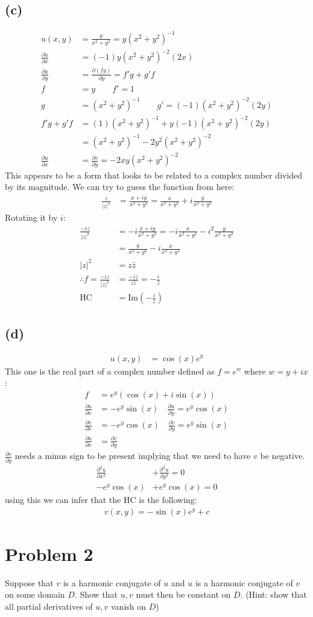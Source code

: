 \documentclass{article}
\let\oldcos\cos
\let\oldsin\sin
\renewcommand{\cos}[1]{\oldcos\left(#1\right)}
\renewcommand{\sin}[1]{\oldsin\left(#1\right)}
\newcommand{\parder}[2]{\frac{\partial#1}{\partial#2}}
\newcommand{\secparder}[2]{\frac{\partial^2#1}{\partial#2^2}}
\begin{document}
\subsection*{(c)}
\begin{align*}
  u(x,y) &= \frac{y}{x^2+y^2} = y(x^2+y^2)^{-1}\\
  \parder{u}{x} &= (-1)y(x^2+y^2)^{-2}(2x)\\
  \parder{u}{y} &= \parder{(fg)}{y} = f'g+g'f\\
  f &= y \quad \quad f' = 1\\
  g &= (x^2+y^2)^{-1} \quad \quad g' = (-1)(x^2+y^2)^{-2}(2y)\\
  f'g+g'f &= (1)(x^2+y^2)^{-1} + y(-1)(x^2+y^2)^{-2}(2y) \\
         &= (x^2+y^2)^{-1} - 2y^2(x^2+y^2)^{-2}\\
  \parder{u}{x} &= \parder{v}{y} = -2xy(x^2+y^2)^{-2}
\end{align*}
This appears to be a form that looks to be related to a complex number divided by its magnitude. We can try to guess the function from here:
\begin{align*}
  \frac{z}{|z|^2} &= \frac{x+iy}{x^2+y^2} = \frac{x}{x^2+y^2} + i\frac{y}{x^2+y^2}
\end{align*}
Rotating it by $i$:
\begin{align*}
  \frac{-iz}{|z|^2} &= -i\frac{x+iy}{x^2+y^2} = -i\frac{x}{x^2+y^2} -i^2\frac{y}{x^2+y^2}\\
                    &= \frac{y}{x^2+y^2}-i\frac{x}{x^2+y^2}\\
  |z|^2 &= z\bar z \\
  \therefore f = \frac{-iz}{|z|^2} &= \frac{-iz}{z\bar z} = -\frac{i}{\bar z}\\
  \text{HC } &= \text{Im}\left(-\frac{i}{\bar z}\right)
\end{align*}
\subsection*{(d)}
\begin{align*}
  u(x,y) &= \cos{x}e^y
\end{align*}
This one is the real part of a complex number defined as $f = e^w$ where $w = y+ix$:
\begin{align*}
  f &= e^y(\cos{x}+i\sin{x}) \\
  \parder{u}{x} &= -e^y\sin{x} \quad \parder{u}{y} = e^y\cos{x}\\
  \parder{v}{x} &= -e^y\cos{x} \quad \parder{v}{y} = e^y\sin{x}\\
  \parder{u}{x} &= \parder{v}{y}
\end{align*}
$\parder{v}{y}$ needs a minus sign to be present implying that we need to have $v$ be negative.
\begin{align*}
  \secparder{u}{x} &+ \secparder{u}{y} = 0  \\
  -e^y\cos{x} &+ e^y\cos{x} = 0
\end{align*}
using this we can infer that the HC is the following:
\begin{align*}
  v(x,y) = -\sin{x}e^y + c
\end{align*}

\newpage
\section*{Problem 2}
Suppose that $v$ is a harmonic conjugate of $u$ and $u$ is a harmonic conjugate of $v$ on some domain $D$. Show that $u,v$ must then be constant on $D$. (Hint: show that all partial derivatives of $u,v$ vanish on $D$)
\end{document}
